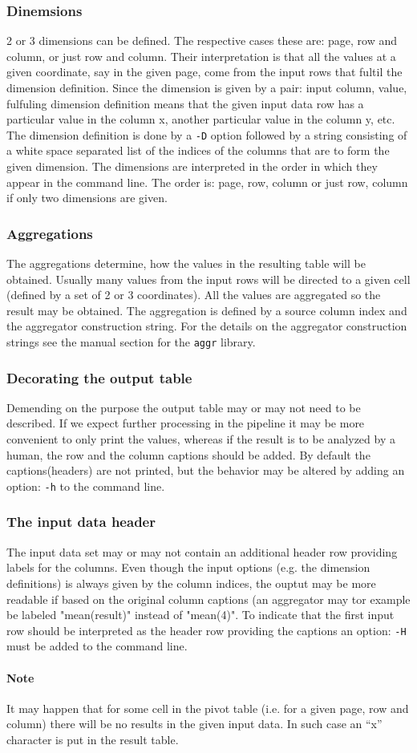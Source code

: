 \documentclass{report}
\begin{document}
	\subsubsection{Dinemsions}
	2 or 3 dimensions can be defined. The respective cases these are: page, row
	and column, or just row and column. Their interpretation is that all the values
	at a given coordinate, say in the given page, come from the input rows that fultil
	the dimension definition. Since the dimension is given by a pair: input column,
	value, fulfuling dimension definition means that the given input data row has
	a particular value in the column x, another particular value in the column y, etc.
	The dimension definition is done by a \texttt{-D} option followed by a string
	consisting of a white space separated list of the indices of the columns that are
	to form the given dimension. The dimensions are interpreted in the order in which
	they appear in the command line. The order is: page, row, column or just row, column
	if only two dimensions are given.

	\subsubsection{Aggregations}
	The aggregations determine, how the values in the resulting table will be obtained.
	Usually many values from the input rows will be directed to a given cell (defined
	by a set of 2 or 3 coordinates). All the values are aggregated so the result may
	be obtained. The aggregation is defined by a source column index and the aggregator
	construction string. For the details on the aggregator construction strings see
	the manual section for the \texttt{aggr} library.

	\subsubsection{Decorating the output table}
	Demending on the purpose the output table may or may not need to be described. If
	we expect further processing in the pipeline it may be more convenient to only
	print the values, whereas if the result is to be analyzed by a human, the row and
	the column captions should be added. By default the captions(headers) are not
	printed, but the behavior may be altered by adding an option: \texttt{-h} to the
	command line.

	\subsubsection{The input data header}
	The input data set may or may not contain an additional header row providing
	labels for the columns. Even though the input options (e.g. the dimension
	definitions) is always given by the column indices, the ouptut may be more
	readable if based on the original column captions (an aggregator may tor example
	be labeled "mean(result)" instead of "mean(4)". To indicate that the first input
	row should be interpreted as the header row providing the captions an option:
	\texttt{-H} must be added to the command line.

	\paragraph{Note}
	It may happen that for some cell in the pivot table (i.e. for a given page, row
	and column) there will be no results in the given input data. In such case an
	``x'' character is put in the result table.
\end{document}
